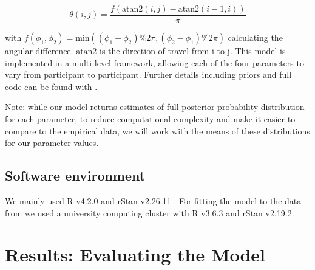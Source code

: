 \documentclass[preprints, article,submit,pdftex,moreauthors]{Definitions/mdpi}
\begin{document}
\begin{linenomath}
\begin{equation}
    \theta(i,j) = \frac{f(\text{atan2}(i, j) - \text{atan2}(i-1, i))}{\pi}
\end{equation}
\end{linenomath}

with $f(\phi_1, \phi_2) = \text{min}((\phi_1 - \phi_2) \% 2\pi, (\phi_2 - \phi_1) \% 2\pi)$ calculating the angular difference. $\text{atan2}$ is the direction of travel from i to j.  This model is implemented in a multi-level framework, allowing each of the four parameters to vary from participant to participant. Further details including priors and full code can be found with \cite{clarke2022foraging}.

Note: while our model returns estimates of full posterior probability distribution for each parameter, to reduce computational complexity and make it easier to compare to the empirical data, we will work with the means of these distributions for our parameter values. 

\subsection{Software environment}
 
We mainly used R v4.2.0 and rStan v2.26.11 \cite{rstan}. For fitting the model to the data from \cite{clarke2022} we used a university computing cluster with R v3.6.3 and rStan v2.19.2.

\section{Results: Evaluating the Model}
\end{document}
